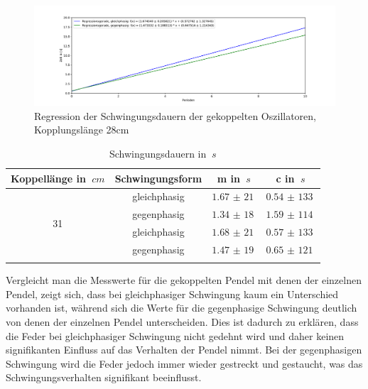\begin{figure}[h!]{}
    \begin{center}
        \includegraphics[scale=0.4]{./Pendel/Protokoll/fig/Koppelpendel_Regression_4.pdf}
        \caption{Regression der Schwingungsdauern der gekoppelten Oszillatoren, Kopplungslänge 28cm}
        \label{fig:Schwingungsdauern-gekoppelte-Oszillatoren2}
    \end{center}
\end{figure}


\begin{table}[h!]
    \begin{center}
        \caption{Schwingungsdauern in $\SI{}{s}$}
        \begin{tabular}{cccc}
            \hline
            Koppellänge in $\SI{}{cm}$ & Schwingungsform & m in $\SI{}{s}$   & c in $\SI{}{s}$ \\
            \hline
            \multirow{4}{*}{31}        & gleichphasig    & $\SI{1,67(21)}{}$ & $\SI{0,54(133)}{}$  \\
                                       & gegenphasig     & $\SI{1,34(18)}{}$ & $\SI{1,59(114)}{}$  \\
            \hline
            \multirow{4}{*}{28}        & gleichphasig    & $\SI{1,68(21)}{}$ & $\SI{0,57(133)}{}$  \\
                                       & gegenphasig     & $\SI{1,47(19)}{}$ & $\SI{0,65(121)}{}$  \\
            \hline
            \label{tab:Koppellaenge-Regressionswerte}
        \end{tabular}
    \end{center}
\end{table}

Vergleicht man die Messwerte für die gekoppelten Pendel mit denen der einzelnen Pendel, zeigt sich, dass bei gleichphasiger Schwingung kaum ein Unterschied vorhanden ist, während sich die Werte für die gegenphasige Schwingung deutlich von denen der einzelnen Pendel unterscheiden.
Dies ist dadurch zu erklären, dass die Feder bei gleichphasiger Schwingung nicht gedehnt wird und daher keinen signifikanten Einfluss auf das Verhalten der Pendel nimmt. Bei der gegenphasigen Schwingung wird die Feder jedoch immer wieder gestreckt und gestaucht, was das Schwingungsverhalten signifikant beeinflusst.

